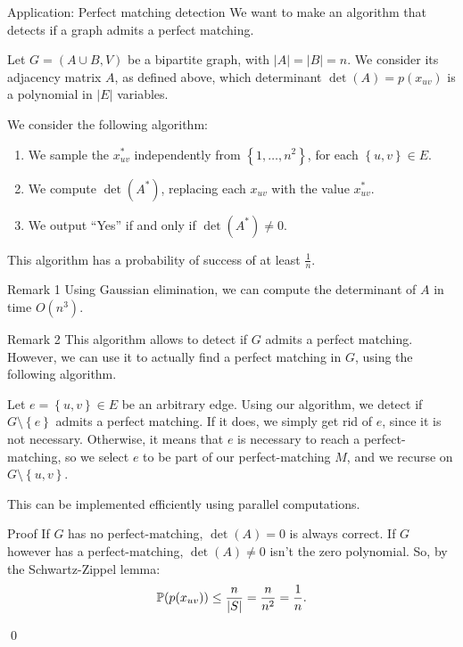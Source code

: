 \documentclass[a4paper]{article}
\begin{document}
\begin{parag}{Application: Perfect matching detection}
    We want to make an algorithm that detects if a graph admits a perfect matching.

    Let $G = \left(A \cup B, V\right)$ be a bipartite graph, with $\left|A\right| = \left|B\right| = n$. We consider its adjacency matrix $A$, as defined above, which determinant $\det\left(A\right) = p\left(x_{uv}\right)$ is a polynomial in $\left|E\right|$ variables.

    We consider the following algorithm:
    \begin{enumerate}
        \item We sample the $x_{uv}^*$ independently from $\left\{1, \ldots, n^2\right\}$, for each $\left\{u, v\right\} \in E$. 
        \item We compute $\det\left(A^*\right)$, replacing each $x_{uv}$ with the value $x^*_{uv}$.
        \item We output ``Yes'' if and only if $\det\left(A^*\right) \neq 0$.
    \end{enumerate}
    
    This algorithm has a probability of success of at least $\frac{1}{n}$.

    \begin{subparag}{Remark 1}
        Using Gaussian elimination, we can compute the determinant of $A$ in time $O\left(n^3\right)$.
    \end{subparag}

    \begin{subparag}{Remark 2}
        This algorithm allows to detect if $G$ admits a perfect matching. However, we can use it to actually find a perfect matching in $G$, using the following algorithm.

        Let $e = \left\{u, v\right\} \in E$ be an arbitrary edge. Using our algorithm, we detect if $G \setminus \left\{e\right\}$ admits a perfect matching. If it does, we simply get rid of $e$, since it is not necessary. Otherwise, it means that $e$ is necessary to reach a perfect-matching, so we select $e$ to be part of our perfect-matching $M$, and we recurse on $G \setminus \left\{u, v\right\}$.

        This can be implemented efficiently using parallel computations.
    \end{subparag}

    \begin{subparag}{Proof}
        If $G$ has no perfect-matching, $\det\left(A\right) = 0$ is always correct.  If $G$ however has a perfect-matching, $\det\left(A\right) \neq 0$ isn't the zero polynomial. So, by the Schwartz-Zippel lemma: 
        \[\prob\left(p\left(x_{uv}\right)\right) \leq \frac{n}{\left|S\right|} = \frac{n}{n^2} = \frac{1}{n}.\]

        \qed
    \end{subparag}
\end{parag}
\end{document}
